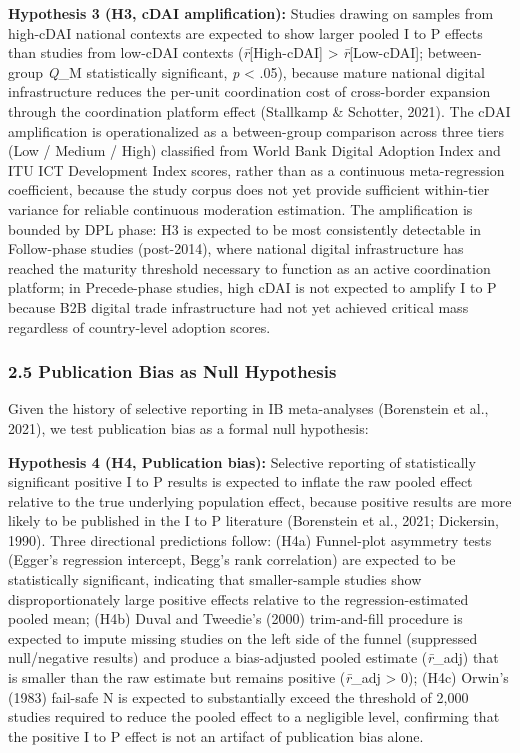 \documentclass[
  12pt,a4paper]{article}
\begin{document}
\textbf{Hypothesis 3 (H3, cDAI amplification):} Studies drawing on
samples from high-cDAI national contexts are expected to show larger
pooled I to P effects than studies from low-cDAI contexts
(\emph{r̄}{[}High-cDAI{]} \textgreater{} \emph{r̄}{[}Low-cDAI{]};
between-group \emph{Q}\_M statistically significant, \emph{p}
\textless{} .05), because mature national digital infrastructure reduces
the per-unit coordination cost of cross-border expansion through the
coordination platform effect (Stallkamp \& Schotter, 2021). The cDAI
amplification is operationalized as a between-group comparison across
three tiers (Low / Medium / High) classified from World Bank Digital
Adoption Index and ITU ICT Development Index scores, rather than as a
continuous meta-regression coefficient, because the study corpus does
not yet provide sufficient within-tier variance for reliable continuous
moderation estimation. The amplification is bounded by DPL phase: H3 is
expected to be most consistently detectable in Follow-phase studies
(post-2014), where national digital infrastructure has reached the
maturity threshold necessary to function as an active coordination
platform; in Precede-phase studies, high cDAI is not expected to amplify
I to P because B2B digital trade infrastructure had not yet achieved
critical mass regardless of country-level adoption scores.

\hypertarget{publication-bias-as-null-hypothesis}{%
\subsubsection{2.5 Publication Bias as Null
Hypothesis}\label{publication-bias-as-null-hypothesis}}

Given the history of selective reporting in IB meta-analyses (Borenstein
et al., 2021), we test publication bias as a formal null hypothesis:

\textbf{Hypothesis 4 (H4, Publication bias):} Selective reporting of
statistically significant positive I to P results is expected to inflate
the raw pooled effect relative to the true underlying population effect,
because positive results are more likely to be published in the I to P
literature (Borenstein et al., 2021; Dickersin, 1990). Three directional
predictions follow: (H4a) Funnel-plot asymmetry tests (Egger's
regression intercept, Begg's rank correlation) are expected to be
statistically significant, indicating that smaller-sample studies show
disproportionately large positive effects relative to the
regression-estimated pooled mean; (H4b) Duval and Tweedie's (2000)
trim-and-fill procedure is expected to impute missing studies on the
left side of the funnel (suppressed null/negative results) and produce a
bias-adjusted pooled estimate (\emph{r̄}\_adj) that is smaller than the
raw estimate but remains positive (\emph{r̄}\_adj \textgreater{} 0);
(H4c) Orwin's (1983) fail-safe N is expected to substantially exceed the
threshold of 2,000 studies required to reduce the pooled effect to a
negligible level, confirming that the positive I to P effect is not an
artifact of publication bias alone.
\end{document}
